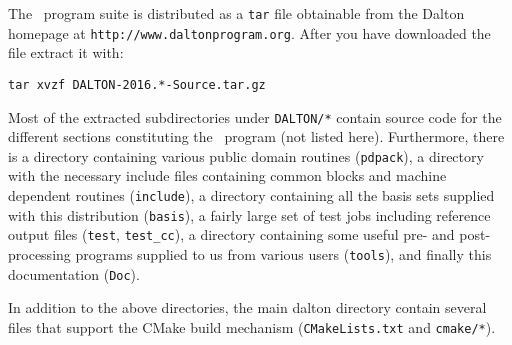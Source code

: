 The \latestrelease\ program suite is distributed as a \verb|tar|
file obtainable from
the Dalton homepage at \verb|http://www.daltonprogram.org|.
After you have downloaded the file extract it with:
\begin{verbatim}
tar xvzf DALTON-2016.*-Source.tar.gz
\end{verbatim}
Most of the extracted subdirectories under \verb|DALTON/*| contain source code for the different
sections constituting the \dalton\ program (not listed here).
Furthermore, there is a
directory containing various public domain routines (\verb|pdpack|), a
directory with the necessary include files containing common blocks and machine
dependent routines (\verb|include|), a directory containing all the basis sets
supplied with this distribution (\verb|basis|), a fairly large set of test jobs
including reference output files (\verb|test|, \verb|test_cc|), a directory
containing some useful pre- and post-processing programs supplied to us from
various users (\verb|tools|), and finally this documentation (\verb|Doc|). 

In addition to the above directories, the main dalton directory contain several
files that support the CMake build mechanism (\verb|CMakeLists.txt| and \verb|cmake/*|).
